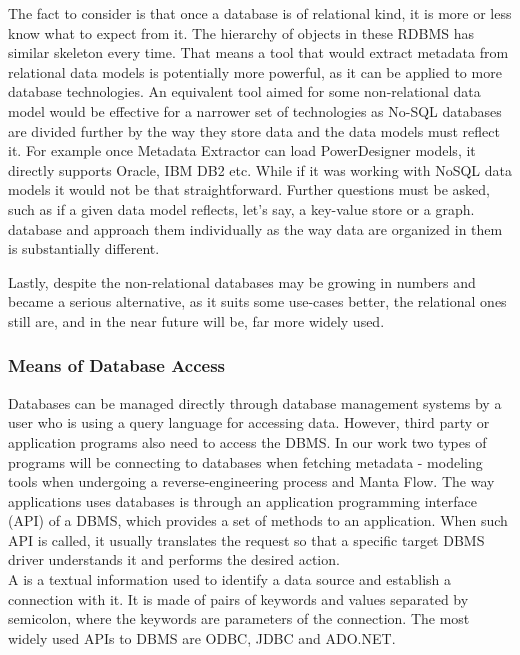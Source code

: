 The fact to consider is that once a database is of relational kind, it is more or less know what to expect from it. 
The hierarchy of objects in these RDBMS has similar skeleton every time. 
That means a tool that would extract metadata from relational data models is potentially more powerful, as it can be applied to more database technologies. 
An equivalent tool aimed for some non-relational data model would be effective for a narrower set of technologies as No-SQL databases are divided further by the way they store data and the data models must reflect it.
For example once Metadata Extractor can load PowerDesigner models, it directly supports Oracle, IBM DB2 etc.
While if it was working with NoSQL data models it would not be that straightforward. Further questions must be asked, such as if a given data model reflects, let's say, a key-value store or a graph. database and approach them individually as the way data are organized in them is substantially different.

Lastly, despite the non-relational databases may be growing in numbers and became a serious alternative, as it suits some use-cases better, the relational ones still are, and in the near future will be, far more widely used.

\subsubsection{Means of Database Access}

Databases can be managed directly through database management systems by a user who is using a query language for accessing data. 
However, third party or application programs also need to access the DBMS. 
In our work two types of programs will be connecting to databases when fetching metadata - modeling tools when undergoing a reverse-engineering process and Manta Flow.
The way applications uses databases is through an application programming interface (API) of a DBMS, which provides a set of methods to an application.
When such API is called, it usually translates the request so that a specific target DBMS driver understands it and performs the desired action. \\

A  is a textual information used to identify a data source and establish a connection with it. It is made of pairs of keywords and values separated by semicolon, where the keywords are parameters of the connection. The most widely used APIs to DBMS are ODBC, JDBC and ADO.NET.

